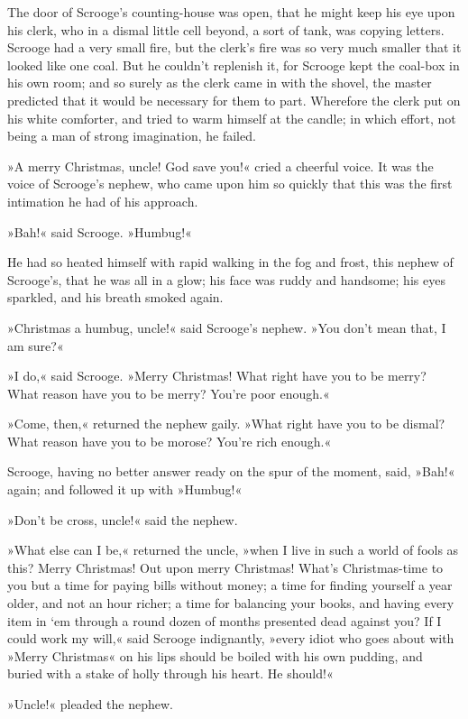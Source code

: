 The door of Scrooge's counting-house was open, that he might keep his eye upon his clerk, who in a dismal little cell beyond, a sort of tank, was copying letters. Scrooge had a very small fire, but the clerk's fire was so very much smaller that it looked like one coal. But he couldn't replenish it, for Scrooge kept the coal-box in his own room; and so surely as the clerk came in with the shovel, the master predicted that it would be necessary for them to part. Wherefore the clerk put on his white comforter, and tried to warm himself at the candle; in which effort, not being a man of strong imagination, he failed.

»A merry Christmas, uncle! God save you!« cried a cheerful voice. It was the voice of Scrooge's nephew, who came upon him so quickly that this was the first intimation he had of his approach.

»Bah!« said Scrooge. »Humbug!«

He had so heated himself with rapid walking in the fog and frost, this nephew of Scrooge's, that he was all in a glow; his face was ruddy and handsome; his eyes sparkled, and his breath smoked again.

»Christmas a humbug, uncle!« said Scrooge's nephew. »You don't mean that, I am sure?«

»I do,« said Scrooge. »Merry Christmas! What right have you to be merry? What reason have you to be merry? You're poor enough.«

»Come, then,« returned the nephew gaily. »What right have you to be dismal? What reason have you to be morose? You're rich enough.«

Scrooge, having no better answer ready on the spur of the moment, said, »Bah!« again; and followed it up with »Humbug!«

»Don't be cross, uncle!« said the nephew.

»What else can I be,« returned the uncle, »when I live in such a world of fools as this? Merry Christmas! Out upon merry Christmas! What's Christmas-time to you but a time for paying bills without money; a time for finding yourself a year older, and not an hour richer; a time for balancing your books, and having every item in `em through a round dozen of months presented dead against you? If I could work my will,« said Scrooge indignantly, »every idiot who goes about with »Merry Christmas« on his lips should be boiled with his own pudding, and buried with a stake of holly through his heart. He should!«

»Uncle!« pleaded the nephew.

